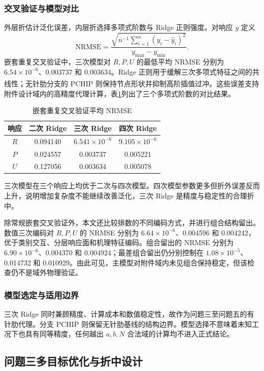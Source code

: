 \documentclass[12pt,a4paper]{article}
\newcommand{\upcite}[1]{\textsuperscript{\cite{#1}}}
\begin{document}
\subsubsection{交叉验证与模型对比}
外层折估计泛化误差，内层折选择多项式阶数与 Ridge 正则强度。对响应 $y$ 定义
\begin{equation}\mathrm{NRMSE}=\frac{\sqrt{n^{-1}\sum_{i=1}^n(y_i-\hat y_i)^2}}{y_{\max}-y_{\min}}.\end{equation}
嵌套重复交叉验证中，三次模型对 $R,P,U$ 的最低平均 NRMSE 分别为 $6.54\times10^{-6}$、$0.003737$ 和 $0.003634$。Ridge 正则用于缓解三次多项式特征之间的共线性\upcite{ref5}；无针肋分支的 PCHIP 则保持节点形状并抑制高阶插值过冲\upcite{ref6}。这些误差支持附件设计域内的高精度代理计算，表\ref{tab:q2-nrmse}列出了三个多项式阶数的对比结果。
\begin{table}[H]\centering\small\caption{嵌套重复交叉验证平均 NRMSE}\label{tab:q2-nrmse}
\begin{tabular}{cccc}\toprule
响应&二次 Ridge&三次 Ridge&四次 Ridge\\\midrule
$R$&0.094140&$6.541\times10^{-6}$&$9.105\times10^{-6}$\\
$P$&0.024557&0.003737&0.005221\\
$U$&0.127056&0.003634&0.005078\\\bottomrule
\end{tabular}\end{table}
三次模型在三个响应上均优于二次与四次模型。四次模型参数更多但折外误差反而上升，说明增加复杂度不能继续改善泛化，三次 Ridge 是精度与稳定性的合理折中。

除常规嵌套交叉验证外，本文还比较排数的不同编码方式，并进行组合结构留出。数值三次编码对 $R,P,U$ 的 NRMSE 分别为 $6.64\times10^{-6}$、0.004596 和 0.004242，优于类别交互、分层响应面和机理特征编码。组合留出的 NRMSE 分别为 $6.90\times10^{-6}$、0.004370 和 0.004924；最差组合留出仍分别控制在 $1.08\times10^{-5}$、0.014732 和 0.010929。由此可见，主模型对附件域内未见组合保持稳定，但该检查仍不是域外物理验证。

\subsubsection{模型选定与适用边界}
三次 Ridge 同时兼顾精度、计算成本和数值稳定性，故作为问题三至问题五的有针肋代理。分支 PCHIP 则保留无针肋基线的结构边界。模型选择不意味着未知工况下也具有同等精度，任何越出 $a,b,N$ 合法域的计算均不进入正式结论。

\subsection{问题三多目标优化与折中设计}
\end{document}
